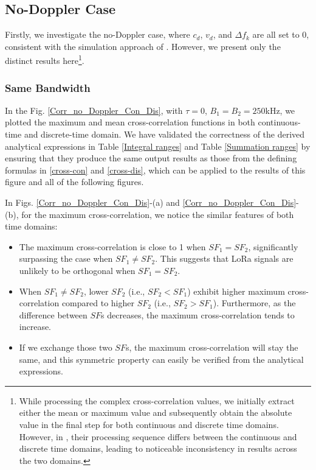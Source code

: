 \documentclass{IEEEtaes}
\theoremstyle{plain}
\begin{document}
\subsection{No-Doppler Case}
Firstly, we investigate the no-Doppler case, where $c_d$, $v_d$, and $\Delta f_k$ are all set to 0, consistent with the simulation approach of \cite{benkhelifa2022orthogonal}. However, we present only the distinct results here\footnote{While processing the complex cross-correlation values, we initially extract either the mean or maximum value and subsequently obtain the absolute value in the final step for both continuous and discrete time domains. However, in \cite{benkhelifa2022orthogonal}, their processing sequence differs between the continuous and discrete time domains, leading to noticeable inconsistency in results across the two domains.}.

\subsubsection{Same Bandwidth}
In the Fig. \ref{Corr_no_Doppler_Con_Dis}, with $\tau = 0$, $B_1=B_2=250$kHz, we plotted the maximum and mean cross-correlation functions in both continuous-time and discrete-time domain.
We have validated the correctness of the derived analytical expressions in Table \ref{Integral ranges} and Table \ref{Summation ranges} by ensuring that they produce the same output results as those from the defining formulas in \eqref{cross-con} and \eqref{cross-dis}, which can be applied to the results of this figure and all of the following figures.

In Figs. \ref{Corr_no_Doppler_Con_Dis}-(a) and \ref{Corr_no_Doppler_Con_Dis}-(b), for the maximum cross-correlation, we notice the similar features of both time domains: 
\begin{itemize}
    \item The maximum cross-correlation is close to 1 when $SF_1 = SF_2$, significantly surpassing the case when $SF_1 \neq SF_2$. This suggests that LoRa signals are unlikely to be orthogonal when $SF_1 = SF_2$.
    \item When $SF_1 \neq SF_2$, lower $SF_2$ (i.e., $SF_2<SF_1$) exhibit higher maximum cross-correlation compared to higher $SF_2$ (i.e., $SF_2>SF_1$). Furthermore, as the difference between $SF$s decreases, the maximum cross-correlation tends to increase.
    \item If we exchange those two $SF$s, the maximum cross-correlation will stay the same, and this symmetric property can easily be verified from the analytical expressions.
\end{itemize}
\end{document}
